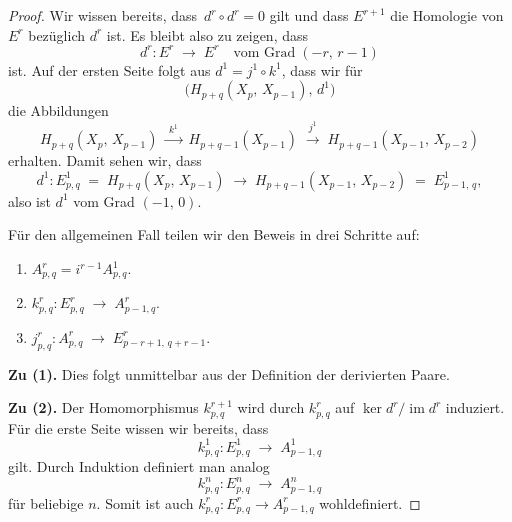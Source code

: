 \documentclass[12pt]{article}
\numberwithin{conj}{section}
\newcommand{\ima}{\operatorname{im}}
\begin{document}
    \begin{proof}
        Wir wissen bereits, dass $\,d^{r} \circ d^{r} = 0$ gilt und dass $E^{r+1}$
        die Homologie von $E^{r}$ bezüglich $d^{r}$ ist. Es bleibt also zu zeigen,
        dass
        \[
            d^{r} : E^{r} \;\longrightarrow\; E^{r} \quad\text{vom Grad}\; (-r,\,r-1)
        \]
        ist. Auf der ersten Seite folgt aus $d^{1} = j^{1} \circ k^{1}$, dass wir
        für
        \[
             \bigl(H_{p+q}(X_{p},\,X_{p-1}),\,d^{1}\bigr)
        \]
        die Abbildungen
        \[
            H_{p+q}(X_{p},\,X_{p-1}) \;\xrightarrow{\;k^1\;}\; H_{p+q-1}(X_{p-1}) \;\xrightarrow
            {\;j^1\;}\; H_{p+q-1}(X_{p-1},\,X_{p-2})
        \]
        erhalten. Damit sehen wir, dass
        \[
            d^{1} : E^{1}_{p,q}\;=\; H_{p+q}(X_{p},\,X_{p-1}) \;\longrightarrow\; H_{p+q-1}
            (X_{p-1},\,X_{p-2}) \;=\; E^{1}_{p-1,\,q},
        \]
        also ist $d^{1}$ vom Grad $(-1,\,0)$.

        Für den allgemeinen Fall teilen wir den Beweis in drei Schritte auf:

        \begin{enumerate}[nolistsep]
            \item $A^{r}_{p,q}= i^{r-1} A^{1}_{p,q} $.

            \item $k^{r}_{p,q}: E^{r}_{p,q}\;\longrightarrow\; A^{r}_{p-1,q}$.

            \item $j^{r}_{p,q}: A^{r}_{p,q}\;\longrightarrow\; E^{r}_{p-r+1,\,q+r-1}$.
        \end{enumerate}

        \noindent
        \textbf{Zu (1).} Dies folgt unmittelbar aus der Definition der derivierten
        Paare.

        \smallskip
        \noindent
        \textbf{Zu (2).} Der Homomorphismus $k^{r+1}_{p,q}$ wird durch $k^{r}_{p,q}$
        auf $\ker d^{r} / \ima d^{r}$ induziert. Für die erste Seite wissen wir
        bereits, dass
        \[
            k^{1}_{p,q}: E^{1}_{p,q}\;\longrightarrow\; A^{1}_{p-1,q}
        \]
        gilt. Durch Induktion definiert man analog
        \[
            k^{n}_{p,q}: E^{n}_{p,q}\;\longrightarrow\; A^{n}_{p-1,q}
        \]
        für beliebige $n$. Somit ist auch $k^{r}_{p,q}: E^{r}_{p,q}\to A^{r}_{p-1,q}$
        wohldefiniert.


\end{proof}
\end{document}
